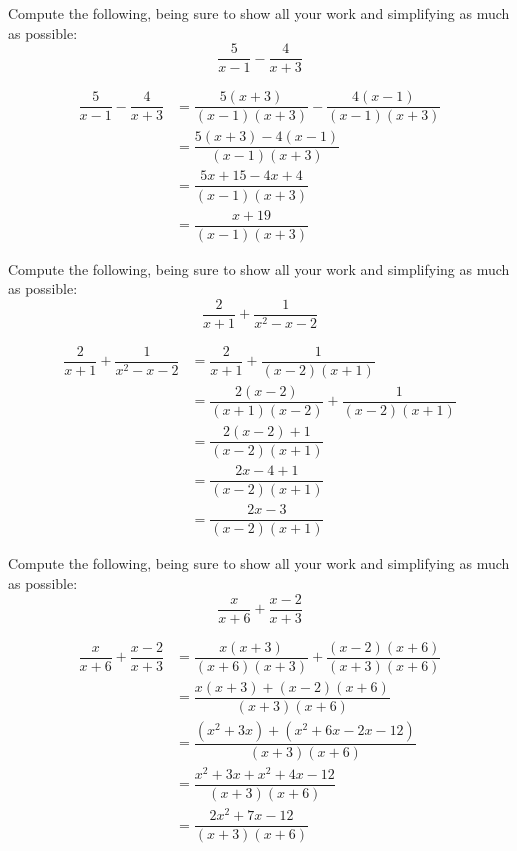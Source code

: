 \documentclass[11pt,letterpaper]{article}
\begin{document}

 Compute the following, being sure to show all your work and simplifying as much as possible:
	\[
	\dfrac{5}{x - 1} - \dfrac{4}{x + 3}
	\] \pspace

\sol
	\[
	\begin{aligned}
	\dfrac{5}{x - 1} - \dfrac{4}{x + 3}&= \dfrac{5(x + 3)}{(x - 1)(x + 3)} - \dfrac{4(x - 1)}{(x - 1)(x + 3)} \\[0.3cm]
	&= \dfrac{5(x + 3) - 4(x - 1)}{(x - 1)(x + 3)} \\[0.3cm]
	&= \dfrac{5x + 15 - 4x + 4}{(x - 1)(x + 3)} \\[0.3cm]
	&= \dfrac{x + 19}{(x - 1)(x + 3)}
	\end{aligned}
	\]





\newpage





 Compute the following, being sure to show all your work and simplifying as much as possible:
	\[
	\dfrac{2}{x + 1} + \dfrac{1}{x^2 - x - 2}
	\] \pspace

\sol
	\[
	\begin{aligned}
	\dfrac{2}{x + 1} + \dfrac{1}{x^2 - x - 2}&= \dfrac{2}{x + 1} + \dfrac{1}{(x - 2)(x + 1)} \\[0.3cm]
	&= \dfrac{2(x - 2)}{(x + 1)(x - 2)} + \dfrac{1}{(x - 2)(x + 1)} \\[0.3cm]
	&= \dfrac{2(x - 2) + 1}{(x - 2)(x + 1)} \\[0.3cm]
	&= \dfrac{2x - 4 + 1}{(x - 2)(x + 1)} \\[0.3cm]
	&= \dfrac{2x - 3}{(x - 2)(x + 1)} 
	\end{aligned}
	\]





\newpage





 Compute the following, being sure to show all your work and simplifying as much as possible:
	\[
	\dfrac{x}{x + 6} + \dfrac{x - 2}{x + 3}
	\] \pspace

\sol 
	\[
	\begin{aligned}
	\dfrac{x}{x + 6} + \dfrac{x - 2}{x + 3}&= \dfrac{x(x + 3)}{(x + 6)(x + 3)} + \dfrac{(x - 2)(x + 6)}{(x + 3)(x + 6)} \\[0.3cm] 
	&= \dfrac{x(x + 3) + (x - 2)(x + 6)}{(x + 3)(x + 6)} \\[0.3cm] 
	&= \dfrac{(x^2 + 3x) + (x^2 + 6x - 2x - 12)}{(x + 3)(x + 6)} \\[0.3cm]
	&= \dfrac{x^2 + 3x + x^2 + 4x - 12}{(x + 3)(x + 6)} \\[0.3cm]
	&= \dfrac{2x^2 + 7x - 12}{(x + 3)(x + 6)} 
	\end{aligned}
	\]
\end{document}
